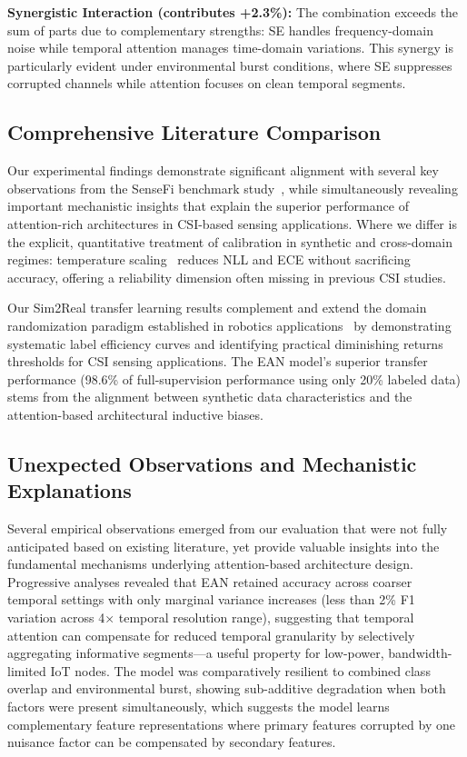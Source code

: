 \documentclass[lettersize,journal]{IEEEtran}
\begin{document}
\textbf{Synergistic Interaction (contributes +2.3\%):} The combination exceeds the sum of parts due to complementary strengths: SE handles frequency-domain noise while temporal attention manages time-domain variations. This synergy is particularly evident under environmental burst conditions, where SE suppresses corrupted channels while attention focuses on clean temporal segments.

\subsection{Comprehensive Literature Comparison}

Our experimental findings demonstrate significant alignment with several key observations from the SenseFi benchmark study~\cite{yang2023sensefi}, while simultaneously revealing important mechanistic insights that explain the superior performance of attention-rich architectures in CSI-based sensing applications. Where we differ is the explicit, quantitative treatment of calibration in synthetic and cross-domain regimes: temperature scaling~\cite{calibration_guo2017} reduces NLL and ECE without sacrificing accuracy, offering a reliability dimension often missing in previous CSI studies.

Our Sim2Real transfer learning results complement and extend the domain randomization paradigm established in robotics applications~\cite{peng2018sim2real} by demonstrating systematic label efficiency curves and identifying practical diminishing returns thresholds for CSI sensing applications. The EAN model's superior transfer performance (98.6\% of full-supervision performance using only 20\% labeled data) stems from the alignment between synthetic data characteristics and the attention-based architectural inductive biases.

\subsection{Unexpected Observations and Mechanistic Explanations}

Several empirical observations emerged from our evaluation that were not fully anticipated based on existing literature, yet provide valuable insights into the fundamental mechanisms underlying attention-based architecture design. Progressive analyses revealed that EAN retained accuracy across coarser temporal settings with only marginal variance increases (less than 2\% F1 variation across 4× temporal resolution range), suggesting that temporal attention can compensate for reduced temporal granularity by selectively aggregating informative segments—a useful property for low-power, bandwidth-limited IoT nodes. The model was comparatively resilient to combined class overlap and environmental burst, showing sub-additive degradation when both factors were present simultaneously, which suggests the model learns complementary feature representations where primary features corrupted by one nuisance factor can be compensated by secondary features.
\end{document}
